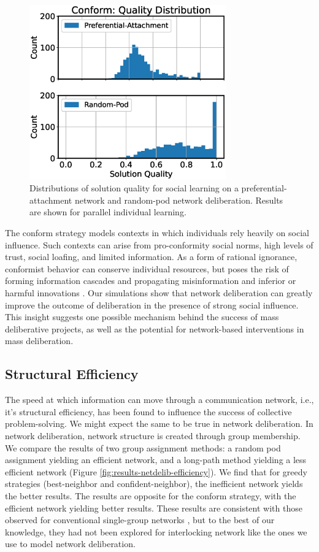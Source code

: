\begin{figure}
    \label{fig:results-conform-dist}
    \centering
    \includegraphics[width=3.33in]{fig/NetDelibABM/fig-results-conform-dist.eps}
\caption{Distributions of solution quality for social learning on a preferential-attachment network and random-pod network deliberation. Results are shown for parallel individual learning.}
\end{figure}

The conform strategy models contexts in which individuals rely heavily on social influence. Such contexts can arise from pro-conformity social norms, high levels of trust, social loafing, and limited information. As a form of rational ignorance, conformist behavior can conserve individual resources, but poses the risk of forming information cascades and propagating misinformation and inferior or harmful innovations \cite{banerjee_simple_1992}. Our simulations show that network deliberation can greatly improve the outcome of deliberation in the presence of strong social influence. This insight suggests one possible mechanism behind the success of mass deliberative projects, as well as the potential for network-based interventions in mass deliberation.

\subsection{Structural Efficiency}

The speed at which information can move through a communication network, i.e., it's structural efficiency, has been found to influence the success of collective problem-solving. We might expect the same to be true in network deliberation. In network deliberation, network structure is created through group membership. We compare the results of two group assignment methods: a random pod assignment yielding an efficient network, and a long-path method yielding a less efficient network (Figure \ref{fig:results-netdelib-efficiency}). We find that for greedy strategies (best-neighbor and confident-neighbor), the inefficient network yields the better results. The results are opposite for the conform strategy, with the efficient network yielding better results. These results are consistent with those observed for conventional single-group networks \cite{barkoczi_social_2016}, but to the best of our knowledge, they had not been explored for interlocking network like the ones we use to model network deliberation.


